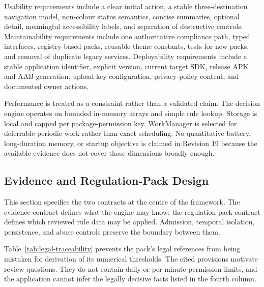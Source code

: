 Usability requirements include a clear initial action, a stable three-destination navigation model, non-colour status semantics, concise summaries, optional detail, meaningful accessibility labels, and separation of destructive controls. Maintainability requirements include one authoritative compliance path, typed interfaces, registry-based packs, reusable theme constants, tests for new packs, and removal of duplicate legacy services. Deployability requirements include a stable application identifier, explicit version, current target SDK, release APK and AAB generation, upload-key configuration, privacy-policy content, and documented owner actions.

Performance is treated as a constraint rather than a validated claim. The decision engine operates on bounded in-memory arrays and simple rule lookup. Storage is local and capped per package-permission key. WorkManager is selected for deferrable periodic work rather than exact scheduling. No quantitative battery, long-duration memory, or startup objective is claimed in Revision 19 because the available evidence does not cover those dimensions broadly enough.

\subsection{Evidence and Regulation-Pack Design}

This section specifies the two contracts at the centre of the framework. The evidence contract defines what the engine may know; the regulation-pack contract defines which reviewed rule data may be applied. Admission, temporal isolation, persistence, and abuse controls preserve the boundary between them.

Table~\ref{tab:legal-traceability} prevents the pack's legal references from being mistaken for derivation of its numerical thresholds. The cited provisions motivate review questions. They do not contain daily or per-minute permission limits, and the application cannot infer the legally decisive facts listed in the fourth column.

